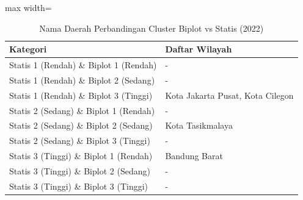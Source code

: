 \begin{table}[H]
\centering
\caption{Nama Daerah Perbandingan Cluster Biplot vs Statis (2022)} \label{tab:samplebiplot_statis_name_2022}
\begin{adjustbox}{max width=\textwidth}
\begin{tabular}{|p{4cm}|p{10cm}|}
\hline
\textbf{Kategori} & \textbf{Daftar Wilayah} \\
\hline
Statis 1 (Rendah) \& Biplot 1 (Rendah) & - \\
\hline
Statis 1 (Rendah) \& Biplot 2 (Sedang) & - \\
\hline
Statis 1 (Rendah) \& Biplot 3 (Tinggi) & Kota Jakarta Pusat, Kota Cilegon \\
\hline
Statis 2 (Sedang) \& Biplot 1 (Rendah) & - \\
\hline
Statis 2 (Sedang) \& Biplot 2 (Sedang) & Kota Tasikmalaya \\
\hline
Statis 2 (Sedang) \& Biplot 3 (Tinggi) & - \\
\hline
Statis 3 (Tinggi) \& Biplot 1 (Rendah) & Bandung Barat \\
\hline
Statis 3 (Tinggi) \& Biplot 2 (Sedang) & - \\
\hline
Statis 3 (Tinggi) \& Biplot 3 (Tinggi) & - \\
\hline
\end{tabular}
\end{adjustbox}
\end{table}